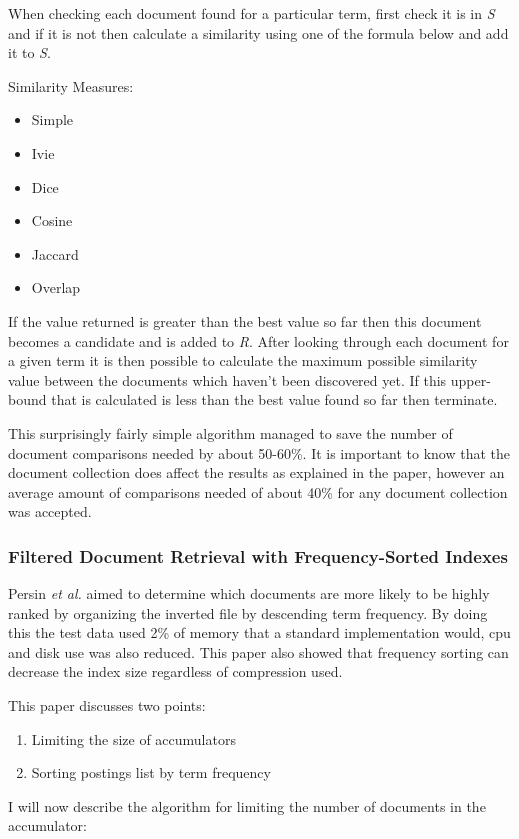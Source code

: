 \documentclass{acm_proc_article-sp}
\begin{document}
When checking each document found for a particular term, first check it is in \emph{S} and if it is not then calculate a similarity using one of the formula below and add it to \emph{S}.

Similarity Measures:
\begin{itemize}
\item Simple
\item Ivie
\item Dice
\item Cosine
\item Jaccard
\item Overlap
\end{itemize}

If the value returned is greater than the best value so far then this document becomes a candidate and is added to \emph{R}. After looking through each document for a given term it is then possible to calculate the maximum possible similarity value between the documents which haven't been discovered yet. If this upper-bound that is calculated is less than the best value found so far then terminate.

This surprisingly fairly simple algorithm managed to save the number of document comparisons needed by about 50-60\%. It is important to know that the document collection does affect the results as explained in the paper, however an average amount of comparisons needed of about 40\% for any document collection was accepted.

\subsubsection{Filtered Document Retrieval with Frequency-Sorted Indexes}

Persin \emph{et al.} \cite{Persin:1996} aimed to determine which documents are more likely to be highly ranked by organizing the inverted file by descending term frequency. By doing this the test data used 2\% of memory that a standard implementation would, cpu and disk use was also reduced. This paper also showed that frequency sorting can decrease the index size regardless of compression used.

This paper discusses two points:
\begin{enumerate}
\item Limiting the size of accumulators
\item Sorting postings list by term frequency
\end{enumerate}
I will now describe the algorithm for limiting the number of documents in the accumulator:
\end{document}
